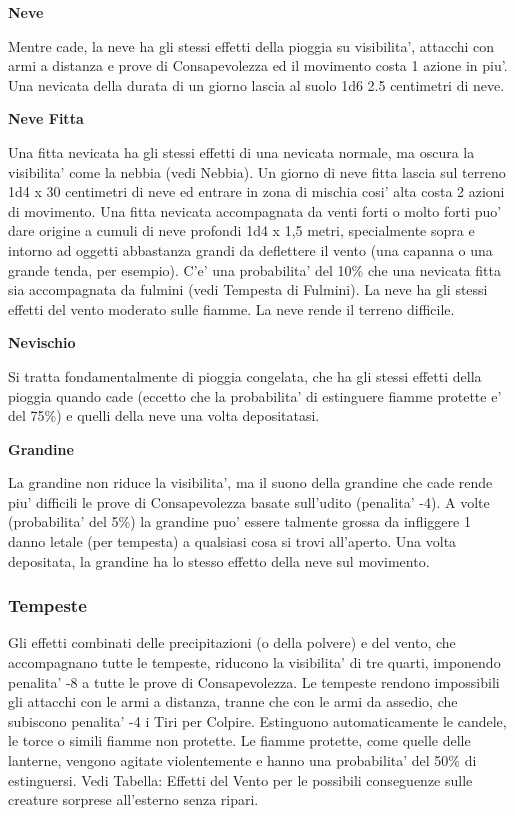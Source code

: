 \documentclass[a4paper,11pt,twoside,openany]{book}
\begin{document}
{		\textbf{Neve}
		
		Mentre cade, la neve ha gli stessi effetti della pioggia su visibilita', attacchi con armi a distanza e prove di Consapevolezza ed il movimento costa 1 azione in piu'. Una nevicata della durata di un giorno lascia al suolo 1d6 \texttimes{} 2.5 centimetri di neve.
		
		\textbf{Neve Fitta}
		
		Una fitta nevicata ha gli stessi effetti di una nevicata normale, ma oscura la visibilita' come la nebbia (vedi Nebbia). Un giorno di neve fitta lascia sul terreno 1d4 x 30 centimetri di neve ed entrare in zona di mischia cosi' alta costa 2 azioni di movimento. Una fitta nevicata accompagnata da venti forti o molto forti puo' dare origine a cumuli di neve profondi 1d4 x 1,5 metri, specialmente sopra e intorno ad oggetti abbastanza grandi da deflettere il vento (una capanna o una grande tenda, per esempio).
		C'e' una probabilita' del 10\% che una nevicata fitta sia accompagnata da fulmini (vedi Tempesta di Fulmini). La neve ha gli stessi effetti del vento moderato sulle fiamme. La neve rende il terreno difficile.
		
		\textbf{Nevischio}
		
		Si tratta fondamentalmente di pioggia congelata, che ha gli stessi effetti della pioggia quando cade (eccetto che la probabilita' di estinguere fiamme protette e' del 75\%) e quelli della neve una volta depositatasi.
		
		\textbf{Grandine}
		
		La grandine non riduce la visibilita', ma il suono della grandine che cade rende piu' difficili le prove di Consapevolezza basate sull'udito (penalita' -4). A volte (probabilita' del 5\%) la grandine puo' essere talmente grossa da infliggere 1 danno letale (per tempesta) a qualsiasi cosa si trovi all'aperto. Una volta depositata, la grandine ha lo stesso effetto della neve sul movimento.
		
		\subsubsection{Tempeste}
		
		\label{tempeste}
		
		Gli effetti combinati delle precipitazioni (o della polvere) e del vento, che accompagnano tutte le tempeste, riducono la visibilita' di tre quarti, imponendo penalita' -8 a tutte le prove di Consapevolezza. Le tempeste rendono impossibili gli attacchi con le armi a distanza, tranne che con le armi da assedio, che subiscono penalita' -4 i Tiri per Colpire.
		Estinguono automaticamente le candele, le torce o simili fiamme non protette. Le fiamme protette, come quelle delle lanterne, vengono agitate violentemente e hanno una probabilita' del 50\% di estinguersi. Vedi Tabella: Effetti del Vento per le possibili conseguenze sulle creature sorprese all'esterno senza ripari. 
		
}
\end{document}
